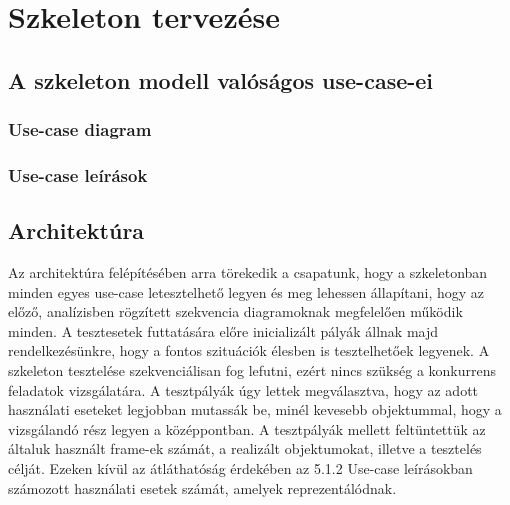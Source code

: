 

\usepackage{enumitem}



\fedlap

\addtocounter{section}{4}
\section{Szkeleton tervezése}

	\subsection{A szkeleton modell valóságos use-case-ei}

		\subsubsection{Use-case diagram}
		
		\subsubsection{Use-case leírások}
	
	\subsection{Architektúra}
		Az architektúra felépítésében arra törekedik a csapatunk, hogy a szkeletonban minden egyes use-case letesztelhető legyen és meg lehessen állapítani, hogy az előző, analízisben rögzített szekvencia diagramoknak megfelelően működik minden. A tesztesetek futtatására előre inicializált pályák állnak majd rendelkezésünkre, hogy a fontos szituációk élesben is tesztelhetőek legyenek. A szkeleton tesztelése szekvenciálisan fog lefutni, ezért nincs szükség a konkurrens feladatok vizsgálatára.
		A tesztpályák úgy lettek megválasztva, hogy az adott használati eseteket legjobban mutassák be, minél kevesebb objektummal, hogy a vizsgálandó rész legyen a középpontban. A tesztpályák mellett feltüntettük az általuk használt frame-ek számát, a realizált objektumokat, illetve a tesztelés célját. Ezeken kívül az átláthatóság érdekében az 5.1.2 Use-case leírásokban számozott használati esetek számát, amelyek reprezentálódnak.
								
